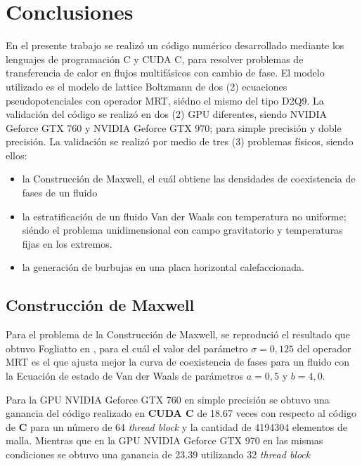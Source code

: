 \chapter{Conclusiones}
\graphicspath{{figs/cap4/}}
\label{cap5}

En el presente trabajo se realizó un código numérico desarrollado mediante los lenguajes de programación C y CUDA C, para resolver problemas de transferencia de calor en flujos multifásicos con cambio de fase.
El modelo utilizado es el modelo de lattice Boltzmann de dos (2) ecuaciones pseudopotenciales con operador MRT, siédno el mismo del tipo D2Q9.
La validación del código se realizó en dos (2) GPU diferentes, siendo NVIDIA Geforce GTX 760 y  NVIDIA Geforce GTX 970; para simple precisión y doble precisión.
La validación se realizó por medio de tres (3) problemas físicos, siendo ellos:

\begin{itemize}
    
    \item la Construcción de Maxwell, el cuál obtiene las densidades de coexistencia de fases de un fluido 

    \item la estratificación de un fluido Van der Waals con temperatura no uniforme; siéndo el problema unidimensional con campo gravitatorio y temperaturas fijas en los extremos.

    \item la generación de burbujas en una placa horizontal calefaccionada.

\end{itemize}

\section{Construcción de Maxwell}

Para el problema de la Construcción de Maxwell, se reprodució el resultado que obtuvo Fogliatto en \cite{fogliatto2019simulation}, para el cuál el valor del parámetro $\sigma = 0,125$ del operador MRT es el que ajusta mejor la curva de coexistencia de fases para un fluido con la Ecuación de estado de Van der Waals de parámetros $ a = 0,5 $ y $ b = 4,0 $. 

Para la GPU NVIDIA Geforce GTX 760 en simple precisión se obtuvo una ganancia del código realizado en \textbf{CUDA C} de 18.67 veces con respecto al código de \textbf{C} para un número de 64 \textit{thread block} y la cantidad de 4194304 elementos de malla. Mientras que en la  GPU NVIDIA Geforce GTX 970 en las mismas condiciones se obtuvo una ganancia de 23.39 utilizando 32 \textit{thread block} 

